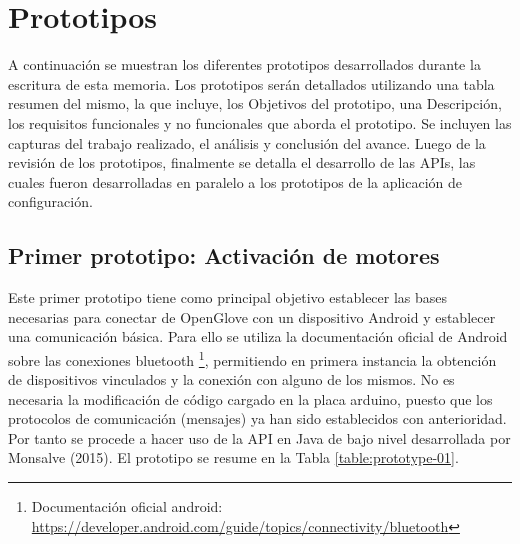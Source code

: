 \section{Prototipos}
\label{seccion-prototipos}
A continuación se muestran los diferentes prototipos desarrollados durante la escritura de esta memoria. Los prototipos serán detallados utilizando una tabla resumen del mismo, la que incluye, los Objetivos del prototipo, una Descripción, los requisitos funcionales y no funcionales que aborda el prototipo.  Se incluyen las capturas del trabajo realizado, el análisis y conclusión del avance. Luego de la revisión de los prototipos, finalmente se detalla el desarrollo de las APIs, las cuales fueron desarrolladas en paralelo a los prototipos de la aplicación de configuración.


\subsection{Primer prototipo:  Activación de motores}
\label{primer-prototipo}
Este primer prototipo tiene como principal objetivo establecer las bases necesarias para conectar de OpenGlove con un dispositivo Android y establecer una comunicación básica. Para ello se utiliza la documentación oficial de Android sobre las conexiones bluetooth \footnote{Documentación oficial android: \url{https://developer.android.com/guide/topics/connectivity/bluetooth}}, permitiendo en primera instancia la obtención de dispositivos vinculados y la conexión con alguno de los mismos. No es necesaria la modificación de código cargado en la placa arduino, puesto que los protocolos de comunicación (mensajes) ya han sido establecidos con anterioridad. Por tanto se procede a hacer uso de la API en Java de bajo nivel desarrollada por Monsalve (2015). El prototipo se resume en la Tabla \ref{table:prototype-01}.


